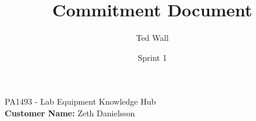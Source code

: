 \title{\textbf{Commitment Document}}
\date{Sprint 1}
\author{Ted Wall}
\maketitle

\begin{center}
PA1493 - Lab Equipment Knowledge Hub \\
\textbf{Customer Name:} Zeth Danielsson
\end{center}

\restoregeometry
\clearpage
